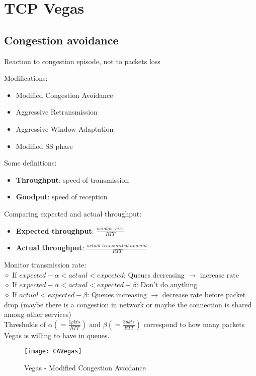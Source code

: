 \section{TCP Vegas}

\subsection{Congestion avoidance}

Reaction to congestion episode, not to packets loss

Modifications:

\begin{itemize}
  \item Modified Congestion Avoidance
  \item Aggressive Retransmission
  \item Aggressive Window Adaptation
  \item Modified SS phase
\end{itemize}

Some definitions:

\begin{itemize}
  \item \textbf{Throughput}: speed of transmission
  \item \textbf{Goodput}: speed of reception
\end{itemize}

Comparing expected and actual throughput:

\begin{itemize}
  \item \textbf{Expected throughput}: $\frac{window\_size}{RTT}$
  \item \textbf{Actual throughput}: $\frac{actual\_transmitted\_amount}{RTT}$
\end{itemize}

Monitor transmission rate: \\

$\diamond$ If $expected - \alpha < actual < expected$:
Queues decreasing $\rightarrow$ increase rate \\

$\diamond$ If $expected - \alpha < actual < expected - \beta$:
Don’t do anything \\

$\diamond$ If $actual < expected - \beta$:
Queues increasing $\rightarrow$ decrease rate before packet drop (maybe there
is a congestion in network or maybe the connection is shared among other
services) \\

Thresholds of $\alpha (= \frac{1 pkts}{RTT})$ and $\beta (= \frac{3 pkts}{RTT})$ correspond to how many packets 
Vegas is willing to have in queues.

\begin{figure}[H]
  \texttt{[image: CAVegas]}
  \caption{Vegas - Modified Congestion Avoidance}
\end{figure}




